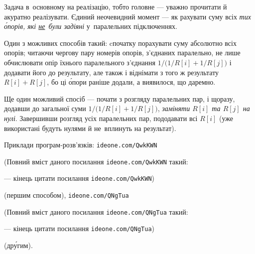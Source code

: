 \documentclass[14pt,a4paper]{extarticle}
\renewcommand{\baselinestretch}{1.3125}
\begin{document}
\Tutorial	Задача в~основному на реалізацію, тобто головне --- уважно прочитати й акуратно реалізувати.
Єдиний неочевидний момент --- як рахувати суму всіх \emph{тих \'{о}порів, які \underline{не}~були задіяні} у~паралельних підключеннях.

Один з можливих способів такий: cпочатку порахувати суму абсолютно всіх опорів; читаючи чергову пару номерів опорів, з’єднаних паралельно, не лише обчислювати опір їхнього паралельного з’єднання $1/\bigl(1/R[i]+1/R[j]\bigr)$ і додавати його до результату, але також і віднімати з того ж результату $R[i]+R[j]$, бо ці \'{о}пори раніше додали, а виявилося, що даремно.

Ще один можливий спосіб --- почати з розгляду паралельних пар, і щоразу, додавши до загальної суми $1/\bigl(1/R[i]+1/R[j]\bigr)$, \emph{заміняти $R[i]$ та $R[j]$ на нулі}. Завершивши розгляд усіх паралельних пар, пододавати всі $R[i]$ (уже використані будуть нулями й не~вплинуть на результат).

Приклади програм-розв’язків: 
\verb"ideone.com/QwkKWN"


{\color{green}\begin{small}

\renewcommand{\baselinestretch}{0.875}

(Повний вміст даного посилання \verb"ideone.com/QwkKWN" такий:

--- кінець цитати посилання \verb"ideone.com/QwkKWN")

\end{small}}


 (першим способом), 
\verb"ideone.com/QNgTua"


{\color{green}\begin{small}

\renewcommand{\baselinestretch}{0.875}

(Повний вміст даного посилання \verb"ideone.com/QNgTua" такий:

--- кінець цитати посилання \verb"ideone.com/QNgTua")

\end{small}}


 (др\'{у}гим).
\end{document}
